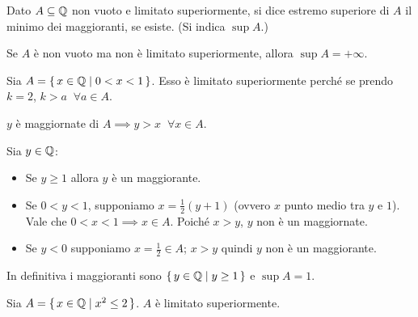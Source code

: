 \begin{definition}
Dato $A \subseteq \mathbb Q$ non vuoto e limitato superiormente, si dice estremo superiore di $A$ il minimo dei maggioranti, se esiste. (Si indica $\sup A$.)
\end{definition}

Se $A$ è non vuoto ma non è limitato superiormente, allora $\sup A = + \infty$.

\begin{example}
Sia $A = \set{x \in \mathbb Q| 0 < x < 1}$.
Esso è limitato superiormente perché se prendo $k = 2$, $k > a \;\; \forall a \in A$.

$y$ è maggiornate di $A \implies y > x \; \; \forall x \in A$.

Sia $y \in \mathbb Q$:
\begin{itemize}
\item Se $y \ge 1$ allora $y$ è un maggiorante.
\item Se $0 < y < 1$, supponiamo $x = \frac{1}{2}(y+1)$ (ovvero $x$ punto medio tra $y$ e $1$). Vale che $0 < x < 1 \implies x \in A$. Poiché $x > y$, $y$ non è un maggiornate.
\item Se $y < 0$ supponiamo $x = \frac{1}{2} \in A$; $x > y$ quindi $y$ non è un maggiorante.
\end{itemize}

In definitiva i maggioranti sono $\set{y \in \mathbb Q| y \ge 1}$ e $\sup A = 1$.
\end{example}

\begin{example}
Sia $A = \set{x \in \mathbb Q| x^2 \le 2}$. $A$ è limitato superiormente.\end{example}

